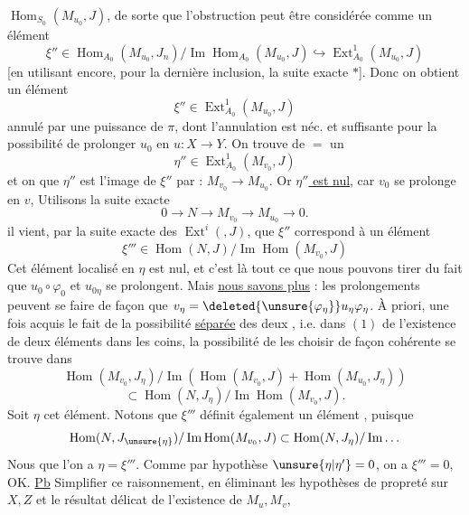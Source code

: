 $\operatorname{Hom}_{S_0}(M_{u_0},J)$, de sorte que l'obstruction
peut être considérée comme un élément
\[
\xi''\in\operatorname{Hom}_{A_0}(M_{u_0},J_n)/\operatorname{Im}\operatorname{Hom}_{A_0}(M_{u_0},J)
\hookrightarrow\operatorname{Ext}^{1}_{A_0}(M_{u_0},J)
\]
[en utilisant encore, pour la dernière inclusion,
la suite exacte $*$]. Donc on obtient un
élément
\[
\xi''\in\operatorname{Ext}^{1}_{A_0}(M_{u_0},J)
\]
annulé par une puissance de $\pi$, dont l'annulation
est néc. et suffisante pour la possibilité de
prolonger $u_0$ en $u:X\longrightarrow Y$. On trouve de
 $=$ un
\[
\eta''\in\operatorname{Ext}^{1}_{A_0}(M_{v_0},J)
\]
et on  que $\eta''$ est l'image de $\xi''$
par : $M_{v_0}\longrightarrow M_{u_0}$. Or \uline{$\eta''$ est nul}, car
$v_0$ se prolonge en $v$,  Utilisons la suite exacte
\[
0\longrightarrow N\longrightarrow M_{v_0}\longrightarrow M_{u_0}\longrightarrow0.
\]
il vient, par la suite exacte des $\operatorname{Ext}^{i}(,J)$, que
$\xi''$ correspond à un élément
\[
\xi'''\in\operatorname{Hom}(N,J)/\operatorname{Im}\operatorname{Hom}(M_{v_0},J)
\]
 Cet élément localisé en $\eta$ est nul,  et
c'est là tout ce que nous pouvons tirer du
fait que $u_0\circ\varphi_0$ et $u_{0\eta}$ se prolongent. Mais
\uline{nous savons plus} : les prolongements  peuvent se faire
de façon que $v_\eta=\deleted{\unsure{\varphi_\eta}}u_\eta\varphi_\eta$. À priori,
 une fois acquis le fait de la possibilité
\uline{séparée} des deux , i.e. dans $(1)$
de l'existence de deux éléments dans les
coins, la  possibilité de les choisir de
façon cohérente se trouve dans
\[
\operatorname{Hom}(M_{v_0},J_\eta)/\operatorname{Im}
(\operatorname{Hom}(M_{v_0},J)+\operatorname{Hom}(M_{u_0},J_\eta))
\]
\[
\subset\operatorname{Hom}(N,J_\eta)/\operatorname{Im}\operatorname{Hom}(M_{v_0},J).
\]
Soit $\eta$ cet élément. Notons que $\xi'''$ définit
également un élément ,
puisque
\[
\operatorname{Hom}(N,J_{\unsure{\eta}})/\operatorname{Im}\operatorname{Hom}(M_{v_0},J)
\subset\operatorname{Hom}(N,J_\eta)/\operatorname{Im}\ldots
\]
Nous  que l'on a $\eta=\xi'''$. Comme
par hypothèse $\unsure{\eta|\eta'}=0$, on a $\xi'''=0$, OK.
\uline{Pb} Simplifier ce  raisonnement, en éliminant
les hypothèses de propreté sur $X,Z$ et le
résultat délicat de l'existence de $M_u,M_v$,
